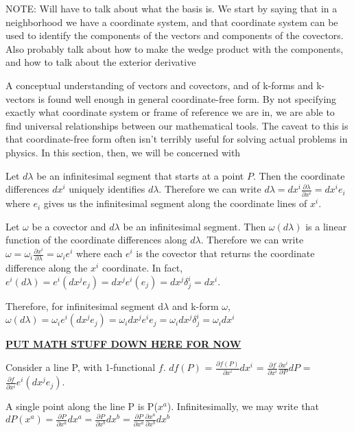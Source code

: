 \documentclass{book}
\begin{document}
NOTE: Will have to talk about what the basis is. We start by saying that in a neighborhood we have a coordinate system, and that coordinate system can be used to identify the components of the vectors and components of the covectors. Also probably talk about how to make the wedge product with the components, and how to talk about the exterior derivative

A conceptual understanding of vectors and covectors, and of k-forms and k-vectors is found well enough in general coordinate-free form. By not specifying exactly what coordinate system or frame of reference we are in, we are able to find universal relationships between our mathematical tools. The caveat to this is that coordinate-free form often isn't terribly useful for solving actual problems in physics. In this section, then, we will be concerned with 

Let $d\lambda$ be an infinitesimal segment that starts at a point $P$. Then the coordinate differences $dx^i$ uniquely identifies $d\lambda$. Therefore we can write $d\lambda = dx^i \frac{\partial \lambda}{\partial x^i} = dx^i e_i$ where $e_i$ gives us the infinitesimal segment along the coordinate lines of $x^i$.

Let $\omega$ be a covector and $d\lambda$ be an infinitesimal segment. Then $\omega(d\lambda)$ is a linear function of the coordinate differences along $d\lambda$. Therefore we can write $\omega = \omega_i \frac{\partial x^i}{\partial \lambda} = \omega_i e^i$ where each $e^i$ is the covector that returns the coordinate difference along the $x^i$ coordinate. In fact, $e^i(d\lambda) = e^i(dx^j e_j) = dx^j e^i(e_j) = dx^j \delta^i_j = dx^i$.


Therefore, for infinitesimal segment d$\lambda$ and k-form $\omega$, $\omega(d\lambda) = \omega_ie^i(dx^je_j) = \omega_idx^je^ie_j = \omega_idx^j\delta^i_j = \omega_i dx^i$ 


\underline{\textbf{PUT MATH STUFF DOWN HERE FOR NOW}}

Consider a line P, with 1-functional $f$. $ df(P)$ = $ \frac{\partial f(P)}{{\partial x^i}} dx^i$ = $ \frac{\partial f}{\partial x^i}\frac{\partial x^i}{\partial P}dP$ = $\frac{{\partial f}}{{\partial x^i}} e^i (dx^j e_j)$. 

A single point along the line P is P($x^a$). Infinitesimally, we may write that  
$dP(x^a) = \frac{\partial P}{\partial x^a} dx^a = \frac{\partial P}{\partial x^b} dx^b = \frac{\partial P}{\partial x^a}\frac{\partial x^a}{\partial x^b} dx^b$
\end{document}
